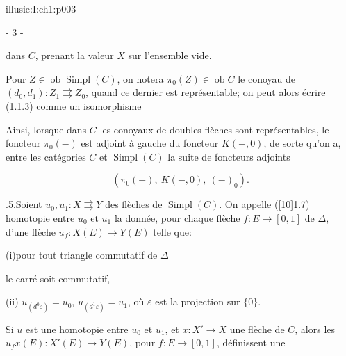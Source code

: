 \IllusieSetPhysicalPageSize{447bp}{698.6bp}
\begin{illusiebodypage}{illusie:I:ch1:p003}
\begin{center}- 3 -\end{center}
\vspace{7bp}\fontsize{9}{14}\selectfont

\hypertarget{illusie:I:ch1:s1:1:p5c1}{}%
\noindent dans $C$, prenant la valeur $X$ sur l'ensemble vide.

\hypertarget{illusie:I:ch1:s1:1:p6}{}%
Pour $Z\in\operatorname{ob}\operatorname{Simpl}(C)$, on notera
$\pi_0(Z)\in\operatorname{ob}C$ le conoyau de\\
$(d_0,d_1):Z_1\rightrightarrows Z_0$, quand ce dernier est représentable; on
peut alors écrire\\(1.1.3) comme un isomorphisme

\hypertarget{illusie:I:ch1:s1:1:eq4}{}%
\noindent{}\par

Ainsi, lorsque dans $C$ les conoyaux de doubles flèches sont représentables,
le foncteur $\pi_0(-)$ est adjoint à gauche du foncteur $K(-,0)$, de sorte
qu'on a, entre les catégories $C$ et $\operatorname{Simpl}(C)$ la suite de
foncteurs adjoints

\hypertarget{illusie:I:ch1:s1:1:d4}{}%
\[ (\pi_0(-),\ K(-,0),\ (-)_0). \]

\hypertarget{illusie:I:ch1:s1:1:p7}{}%
.5.\quad Soient $u_0,u_1:X\rightrightarrows Y$ des flèches de
$\operatorname{Simpl}(C)$. On appelle ([10]1.7)\\
\underline{homotopie entre $u_0$ et $u_1$} la donnée, pour chaque flèche
$f:E\longrightarrow[0,1]$ de $\Delta$,\\d'une flèche
$u_f:X(E)\longrightarrow Y(E)$ telle que:

\hypertarget{illusie:I:ch1:s1:1:d5}{}%
\hspace*{34bp}(i)\quad pour tout triangle commutatif de $\Delta$
\IllusieHomotopyTriangle

\hypertarget{illusie:I:ch1:s1:1:d6}{}%
\noindent le carré
\IllusieHomotopySquare
\noindent soit commutatif,

\hypertarget{illusie:I:ch1:s1:1:p8}{}%
\hspace*{34bp}(ii)\quad
$u_{(d^0\varepsilon)}=u_0$, $u_{(d^1\varepsilon)}=u_1$, où $\varepsilon$ est
la projection sur $\{0\}$.

\hypertarget{illusie:I:ch1:s1:1:p9}{}%
Si $u$ est une homotopie entre $u_0$ et $u_1$, et
$x:X'\longrightarrow X$ une flèche de $C$, alors les
$u_f x(E):X'(E)\longrightarrow Y(E)$, pour $f:E\longrightarrow[0,1]$,
définissent une
\end{illusiebodypage}
